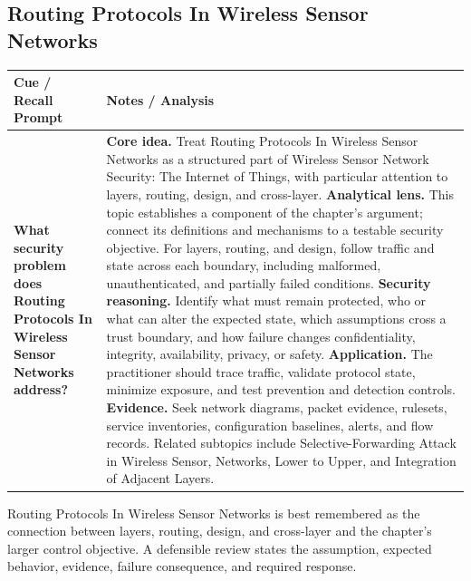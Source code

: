 \documentclass[11pt]{article}
\newcommand{\CornellHeader}{%
\rowcolor{Navy}\color{white}\bfseries Cue / Recall Prompt & \color{white}\bfseries Notes / Analysis\\\hline}
\newcommand{\CornellRow}[2]{%
\cellcolor{CueGray}\RaggedRight\textbf{#1} & \RaggedRight #2\\\hline}
\begin{document}
\subsection*{Routing Protocols In Wireless Sensor Networks}
\begin{longtable}{>{\RaggedRight\arraybackslash}p{}|>{\RaggedRight\arraybackslash}p{}}
\CornellHeader
\CornellRow{What security problem does Routing Protocols In Wireless Sensor Networks address?}{\textbf{Core idea.} Treat Routing Protocols In Wireless Sensor Networks as a structured part of Wireless Sensor Network Security: The Internet of Things, with particular attention to layers, routing, design, and cross-layer. \textbf{Analytical lens.} This topic establishes a component of the chapter's argument; connect its definitions and mechanisms to a testable security objective. For layers, routing, and design, follow traffic and state across each boundary, including malformed, unauthenticated, and partially failed conditions. \textbf{Security reasoning.} Identify what must remain protected, who or what can alter the expected state, which assumptions cross a trust boundary, and how failure changes confidentiality, integrity, availability, privacy, or safety. \textbf{Application.} The practitioner should trace traffic, validate protocol state, minimize exposure, and test prevention and detection controls. \textbf{Evidence.} Seek network diagrams, packet evidence, rulesets, service inventories, configuration baselines, alerts, and flow records. Related subtopics include Selective-Forwarding Attack in Wireless Sensor, Networks, Lower to Upper, and Integration of Adjacent Layers.}
\end{longtable}
\begin{topicsummary}
Routing Protocols In Wireless Sensor Networks is best remembered as the connection between layers, routing, design, and cross-layer and the chapter's larger control objective. A defensible review states the assumption, expected behavior, evidence, failure consequence, and required response.
\end{topicsummary}
\end{document}
